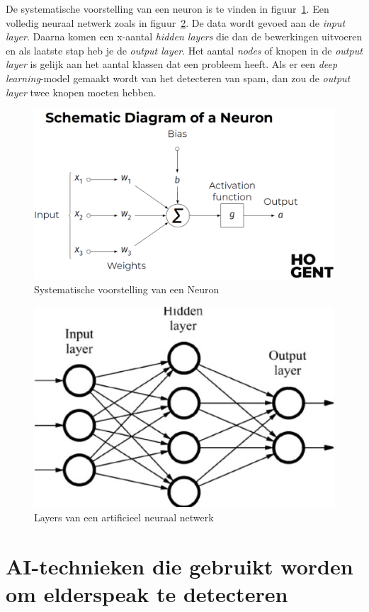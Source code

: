 De systematische voorstelling van een neuron is te vinden in figuur~\ref{fig:neuron}.
Een volledig neuraal netwerk zoals in figuur~\ref{fig:layers}. De data wordt gevoed aan de \textit{input layer}. Daarna komen een x-aantal \textit{hidden layers} die dan de bewerkingen uitvoeren en als laatste stap heb je de \textit{output layer}. Het aantal \textit{nodes} of knopen in de \textit{output layer} is gelijk aan het aantal klassen dat een probleem heeft. Als er een \textit{deep learning}-model gemaakt wordt van het detecteren van spam, dan zou de \textit{output layer} twee knopen moeten hebben.

\begin{figure}
    \centering
    \includegraphics[width=1\textwidth]{./img/neuron}
    \caption{\label{fig:neuron} Systematische voorstelling van een Neuron~\autocite{Lievens2021}}
\end{figure}

\begin{figure}
    \centering
    \includegraphics[width=.5\textwidth]{./img/layers}
    \caption{\label{fig:layers} Layers van een artificieel neuraal netwerk~\autocite{Lievens2021}}
\end{figure}


\section{AI-technieken die gebruikt worden om elderspeak te detecteren}

